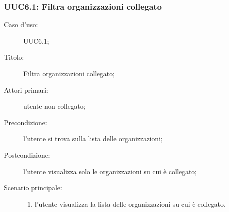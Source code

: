 \documentclass[../../../analisi-dei-requisiti.tex]{subfiles}
\begin{document}
\subsubsection{UUC6.1: Filtra organizzazioni collegato}%
\begin{description}
  \item[Caso d’uso:] UUC6.1;
  \item[Titolo:] Filtra organizzazioni collegato;
  \item[Attori primari:] utente non collegato;
  \item[Precondizione:] l'utente si trova sulla lista delle organizzazioni;
  \item[Postcondizione:] l'utente visualizza solo le organizzazioni su cui è collegato;
  \item[Scenario principale:]
        \begin{enumerate}
          \item l'utente visualizza la lista delle organizzazioni su cui è collegato.
        \end{enumerate}
\end{description}
\end{document}
